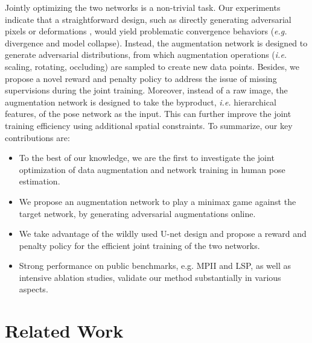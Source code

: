 \documentclass[10pt,twocolumn,letterpaper]{article}
\begin{document}
Jointly optimizing the two networks is a non-trivial task. Our experiments indicate that a straightforward design, such as directly generating adversarial pixels \cite{goodfellow2014gan, reed2016generative} or deformations \cite{wang2017fast, jaderberg2015spatial}, would yield problematic convergence behaviors ({\it e.g.} divergence and model collapse). Instead, the augmentation network is designed to generate adversarial distributions, from which augmentation operations ({\it i.e.} scaling, rotating, occluding) are sampled to create new data points. Besides, we propose a novel reward and penalty policy to address the issue of missing supervisions during the joint training. Moreover, instead of a raw image, the augmentation network is designed to take the byproduct, {\it i.e.} hierarchical features, of the pose network as the input. This can further improve the joint training efficiency using additional spatial constraints. To summarize, our key contributions are:

\begin{itemize}
    \item To the best of our knowledge, we are the first to investigate the joint optimization of data augmentation and network training in human pose estimation.
    
    \item We propose an augmentation network to play a minimax game against the target network, by generating adversarial augmentations online.
    
    \item We take advantage of the wildly used U-net design and propose a reward and penalty policy for the efficient joint training of the two networks.
    
    \item Strong performance on public benchmarks, {e.g.} MPII and LSP, as well as intensive ablation studies, validate our method substantially in various aspects.
\end{itemize}
\section{Related Work}
\end{document}
